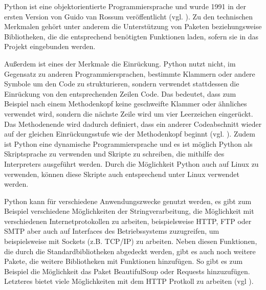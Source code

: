 Python ist eine objektorientierte Programmiersprache und wurde 1991 in der ersten Version von Guido van Rossum veröffentlicht (vgl. \cite{.05.03.2017}). Zu den technischen Merkmalen gehört unter anderem die Unterstützung von Paketen beziehungsweise Bibliotheken, die die entsprechend benötigten Funktionen laden, sofern sie in das Projekt eingebunden werden. 

Außerdem ist eines der Merkmale die Einrückung. Python nutzt nicht, im Gegensatz zu anderen Programmiersprachen, bestimmte Klammern oder andere Symbole um den Code zu strukturieren, sondern verwendet stattdessen die Einrückung von den entsprechenden Zeilen Code. Das bedeutet, dass zum Beispiel nach einem Methodenkopf keine geschweifte Klammer oder ähnliches verwendet wird, sondern die nächste Zeile wird um vier Leerzeichen eingerückt. Das Methodenende wird dadurch definiert, dass ein anderer Codeabschnitt wieder auf der gleichen Einrückungsstufe wie der Methodenkopf  beginnt (vgl. \cite{.19.08.2013}\cite{.10.03.2017b}). 
Zudem ist Python eine dynamische Programmiersprache und es ist möglich Python als Skriptsprache zu verwenden und Skripte zu schreiben, die mithilfe des Interpreters ausgeführt werden. Durch die Möglichkeit Python auch auf Linux zu verwenden, können diese Skripte auch entsprechend unter Linux verwendet werden.

Python kann für verschiedene Anwendungszwecke genutzt werden, es gibt zum Beispiel verschiedene Möglichkeiten der Stringverarbeitung, die Möglichkeit mit verschiedenen Internetprotokollen zu arbeiten, beispielsweise HTTP, FTP oder SMTP aber auch auf Interfaces des Betriebssystems zuzugreifen, um beispielsweise mit Sockets (z.B. TCP/IP) zu arbeiten. Neben diesen Funktionen, die durch die Standardbibliotheken abgedeckt werden, gibt es auch noch weitere Pakete, die weitere Bibliotheken mit Funktionen hinzufügen. So gibt es zum Beispiel die Möglichkeit das Paket BeautifulSoup oder Requests hinzuzufügen. Letzteres bietet viele Möglichkeiten mit dem HTTP Protkoll zu arbeiten (vgl \cite{.m}\cite{.l}\cite{.05.03.2017}). 


